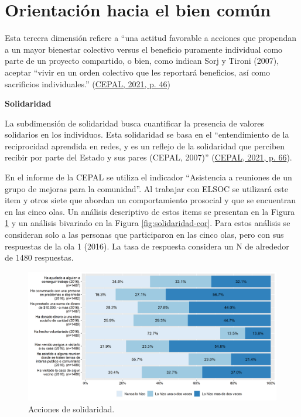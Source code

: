 \documentclass[
  12pt,
]{book}
\begin{document}
\hypertarget{orientaciuxf3n-hacia-el-bien-comuxfan}{%
\section{Orientación hacia el bien común}\label{orientaciuxf3n-hacia-el-bien-comuxfan}}

Esta tercera dimensión refiere a ``una actitud favorable a acciones que propendan a un mayor bienestar colectivo versus el beneficio puramente individual como parte de un proyecto compartido, o bien, como indican Sorj y Tironi (2007), aceptar ``vivir en un orden colectivo que les reportará beneficios, así como sacrificios individuales.'' (\protect\hyperlink{ref-cepal_cohesion_2021}{CEPAL, 2021, p. 46})

\textbf{Solidaridad}

La subdimensión de solidaridad busca cuantificar la presencia de valores solidarios en los individuos. Esta solidaridad se basa en el ``entendimiento de la reciprocidad aprendida en redes, y es un reflejo de la solidaridad que perciben recibir por parte del Estado y sus pares (CEPAL, 2007)'' (\protect\hyperlink{ref-cepal_cohesion_2021}{CEPAL, 2021, p. 66}).

En el informe de la CEPAL se utiliza el indicador ``Asistencia a reuniones de un grupo de mejoras para la comunidad''. Al trabajar con ELSOC se utilizará este item y otros siete que abordan un comportamiento prosocial y que se encuentran en las cinco olas. Un análisis descriptivo de estos items se presentan en la Figura \ref{fig:solidaridad} y un análisis bivariado en la Figura \ref{fig:solidaridad-cor}. Para estos análisis se consideran solo a las personas que participaron en las cinco olas, pero con sus respuestas de la ola 1 (2016). La tasa de respuesta considera un N de alrededor de 1480 respuestas.

\begin{figure}[H]

{\centering \includegraphics[width=1\linewidth,height=1\textheight]{output/graphs/solidaridad} 

}

\caption{Acciones de solidaridad.}\label{fig:solidaridad}
\end{figure}
\end{document}
